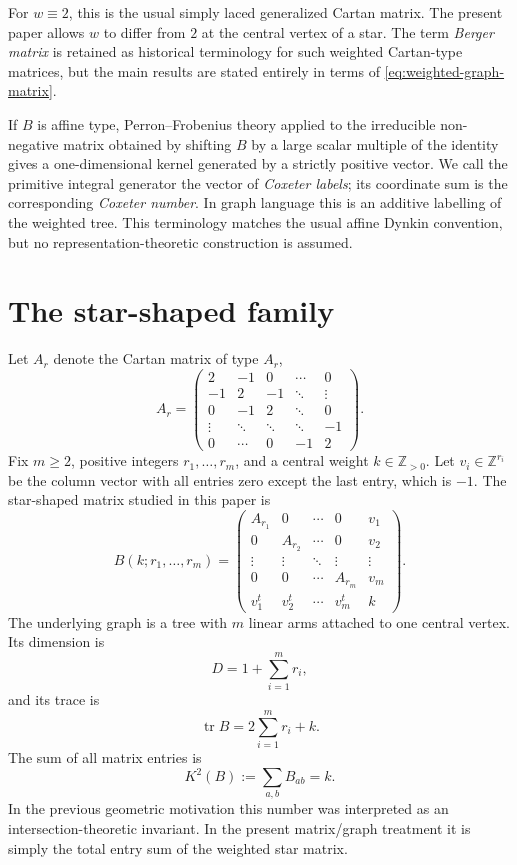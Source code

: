 \documentclass[11pt,a4paper]{article}
\newcommand{\ZZ}{\mathbb Z}
\newcommand{\tr}{\operatorname{tr}}
\theoremstyle{definition}
\theoremstyle{plain}
\begin{document}
For $w\equiv 2$, this is the usual simply laced generalized Cartan matrix.  The present paper allows $w$ to differ from $2$ at the central vertex of a star.  The term \emph{Berger matrix} is retained as historical terminology for such weighted Cartan-type matrices, but the main results are stated entirely in terms of \eqref{eq:weighted-graph-matrix}.

If $B$ is affine type, Perron--Frobenius theory applied to the irreducible non-negative matrix obtained by shifting $B$ by a large scalar multiple of the identity gives a one-dimensional kernel generated by a strictly positive vector.  We call the primitive integral generator the vector of \emph{Coxeter labels}; its coordinate sum is the corresponding \emph{Coxeter number}.  In graph language this is an additive labelling of the weighted tree.  This terminology matches the usual affine Dynkin convention, but no representation-theoretic construction is assumed.

\section{The star-shaped family}
\label{sec:star}

Let $A_r$ denote the Cartan matrix of type $A_r$,
\[
A_r=\begin{pmatrix}
2&-1&0&\cdots&0\\
-1&2&-1&\ddots&\vdots\\
0&-1&2&\ddots&0\\
\vdots&\ddots&\ddots&\ddots&-1\\
0&\cdots&0&-1&2
\end{pmatrix}.
\]
Fix $m\geq 2$, positive integers $r_1,\ldots,r_m$, and a central weight $k\in\ZZ_{>0}$.  Let $v_i\in\ZZ^{r_i}$ be the column vector with all entries zero except the last entry, which is $-1$.  The star-shaped matrix studied in this paper is
\begin{equation}
B(k;r_1,\ldots,r_m)=
\begin{pmatrix}
A_{r_1} &0&\cdots&0&v_1\\
0&A_{r_2}&\cdots&0&v_2\\
\vdots&\vdots&\ddots&\vdots&\vdots\\
0&0&\cdots&A_{r_m}&v_m\\
v_1^t&v_2^t&\cdots&v_m^t&k
\end{pmatrix}.
\label{eq:star-matrix}
\end{equation}
The underlying graph is a tree with $m$ linear arms attached to one central vertex.  Its dimension is
\begin{equation}
D=1+\sum_{i=1}^m r_i,
\label{eq:dimension}
\end{equation}
and its trace is
\begin{equation}
\tr B=2\sum_{i=1}^m r_i+k.
\end{equation}
The sum of all matrix entries is
\begin{equation}
K^2(B):=\sum_{a,b}B_{ab}=k.
\label{eq:K-square}
\end{equation}
In the previous geometric motivation this number was interpreted as an intersection-theoretic invariant.  In the present matrix/graph treatment it is simply the total entry sum of the weighted star matrix.
\end{document}
